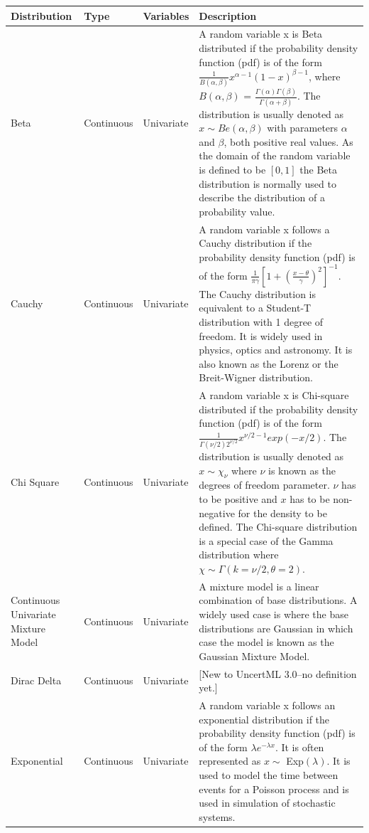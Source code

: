 \documentclass[draftspec]{sbmlpkgspec}
\begin{document}
\begin{blockChanged}
\begin{longtabu} to \linewidth {
    X[2,c]
    X[2,c]
    X[2,c]
    X[10,l]}
\textbf{Distribution} & \textbf{Type} & \textbf{Variables} & \textbf{Description} \\ \midrule
Beta & Continuous & Univariate 
  & A random variable x is Beta distributed if the probability density function (pdf) is of the form $\frac{1}{B\left(\alpha,\beta\right)}x^{\alpha-1}\left(1-x\right)^{\beta-1}$, where $B\left(\alpha,\beta\right)$ = $\frac{\Gamma\left(\alpha\right)\Gamma\left(\beta\right)}{\Gamma\left(\alpha+\beta\right)}$. The distribution is usually denoted as $x\sim Be\left(\alpha,\beta\right)$ with parameters $\alpha$ and $\beta$, both positive real values. As the domain of the random variable is defined to be $[0,1]$ the Beta distribution is normally used to describe the distribution of a probability value. \\ \midrule
Cauchy & Continuous & Univariate 
  & A random variable x follows a Cauchy distribution if the probability density function (pdf) is of the form $\frac{1}{\pi\gamma}\left[1+\left(\frac{x-\theta}{\gamma}\right)^2\right]^{-1}$. The Cauchy distribution is equivalent to a Student-T distribution with 1 degree of freedom. It is widely used in physics, optics and astronomy. It is also known as the Lorenz or the Breit-Wigner distribution.\\ \midrule
Chi Square & Continuous & Univariate 
  & A random variable x is Chi-square distributed if the probability density function (pdf) is of the form $\frac{1}{\Gamma(\nu/2)2^{\nu/2}}x^{\nu/2-1}exp(-x/2)$. The distribution is usually denoted as $x\sim\chi_\nu$ where $\nu$ is known as the degrees of freedom parameter. $\nu$ has to be positive and $x$ has to be non-negative for the density to be defined. The Chi-square distribution is a special case of the Gamma distribution where $\chi \sim\Gamma(k=\nu/2,\theta=2)$. \\ \midrule
Continuous Univariate Mixture Model & Continuous & Univariate 
  & A mixture model is a linear combination of base distributions. A widely used case is where the base distributions are Gaussian in which case the model is known as the Gaussian Mixture Model. \\ \midrule
Dirac Delta & Continuous & Univariate 
  & [New to UncertML 3.0--no definition yet.] \\ \midrule
Exponential & Continuous & Univariate
  & A random variable x follows an exponential distribution if the probability density function (pdf) is of the form $\lambda e^{-\lambda x}$. It is often represented as $x \sim$ Exp$(\lambda)$. It is used to model the time between events for a Poisson process and is used in simulation of stochastic systems. \\ \midrule

\end{longtabu}
\end{blockChanged}
\end{document}
